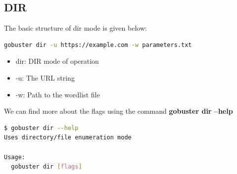 \documentclass[12 pt]{article}
\begin{document}
\subsection{DIR}
The basic structure of dir mode is given below:
\begin{lstlisting}[language=bash]
gobuster dir -u https://example.com -w parameters.txt
\end{lstlisting}
\begin{itemize}
    \item dir: DIR mode of operation
    \item -u: The URL string
    \item -w: Path to the wordlist file 
\end{itemize}
We can find more about the flags using the command \textbf{gobuster dir --help}
\begin{lstlisting}[language=bash]
$ gobuster dir --help
Uses directory/file enumeration mode

Usage:
  gobuster dir [flags]


\end{lstlisting}
\end{document}
